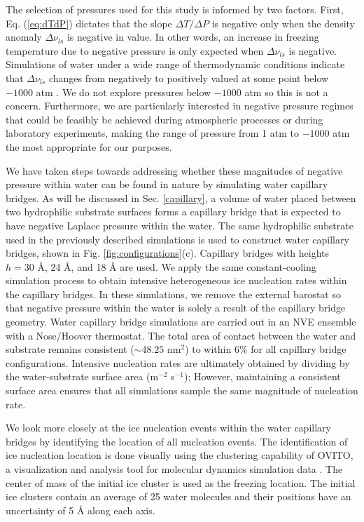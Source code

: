 \documentclass[journal abbreviation, manuscript]{copernicus}
\begin{document}
The selection of pressures used for this study is informed by two factors. First, Eq. (\ref{eq:dTdP}) dictates that the slope $\Delta T/ \Delta P$ is negative only when the density anomaly $\Delta \nu_{ls}$ is negative in value. In other words, an increase in freezing temperature due to negative pressure is only expected when $\Delta \nu_{ls}$ is negative. Simulations of water under a wide range of thermodynamic conditions indicate that $\Delta \nu_{ls}$ changes from negatively to positively valued at some point below $-1000$ atm \citep{bianco2021}. We do not explore pressures below $-1000$ atm so this is not a concern. Furthermore, we are particularly interested in negative pressure regimes that could be feasibly be achieved during atmospheric processes or during laboratory experiments, making the range of pressure from 1 atm to $-1000$ atm the most appropriate for our purposes.

We have taken steps towards addressing whether these magnitudes of negative pressure within water can be found in nature by simulating water capillary bridges. As will be discussed in Sec. \ref{capillary}, a volume of water placed between two hydrophilic substrate surfaces forms a capillary bridge that is expected to have negative Laplace pressure within the water. The same hydrophilic substrate used in the previously described simulations is used to construct water capillary bridges, shown in Fig. \ref{fig:configurations}(c). Capillary bridges with heights $h = 30$ \AA{}, 24 \AA{}, and 18 \AA{} are used. We apply the same constant-cooling simulation process to obtain intensive heterogeneous ice nucleation rates within the capillary bridges. In these simulations, we remove the external barostat so that negative pressure within the water is solely a result of the capillary bridge geometry. Water capillary bridge simulations are carried out in an NVE ensemble with a Nose/Hoover thermostat. The total area of contact between the water and substrate remains consistent ($\sim 48.25$ nm$^2$) to within 6\% for all capillary bridge configurations. Intensive nucleation rates are ultimately obtained by dividing by the water-substrate surface area (m$^{-2}$ s$^{-1}$); However, maintaining a consistent surface area ensures that all simulations sample the same magnitude of nucleation rate.

We look more closely at the ice nucleation events within the water capillary bridges by identifying the location of all nucleation events. The identification of ice nucleation location is done visually using the clustering capability of OVITO, a visualization and analysis tool for molecular dynamics simulation data \citep{ovito}. The center of mass of the initial ice cluster is used as the freezing location. The initial ice clusters contain an average of 25 water molecules and their positions have an uncertainty of 5 \AA{} along each axis.
\end{document}
